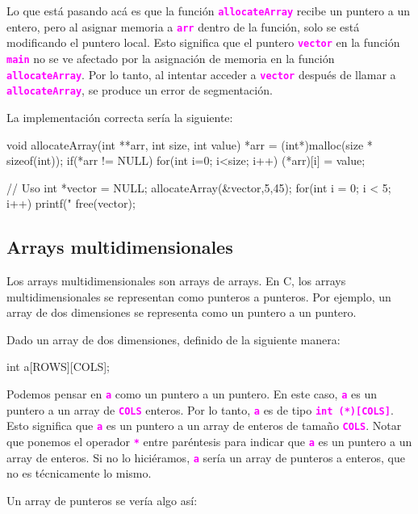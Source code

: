 \documentclass[]{scrartcl}
\newcommand{\hl}[1]{\textcolor{magenta}{\textbf{\texttt{#1}}}}
\begin{document}
Lo que está pasando acá es que la función \hl{allocateArray} recibe un puntero a un entero, pero al asignar memoria a \hl{arr} dentro de la función, solo se está modificando el puntero local. Esto significa que el puntero \hl{vector} en la función \hl{main} no se ve afectado por la asignación de memoria en la función \hl{allocateArray}. Por lo tanto, al intentar acceder a \hl{vector} después de llamar a \hl{allocateArray}, se produce un error de segmentación.

La implementación correcta sería la siguiente:

\begin{cbox}[]{}
  void allocateArray(int **arr, int size, int value) {
    *arr = (int*)malloc(size * sizeof(int));
    if(*arr != NULL) {
      for(int i=0; i<size; i++) {
        (*arr)[i] = value;
      }
    }
  }
  
  // Uso
  int *vector = NULL;
  allocateArray(&vector,5,45);
  for(int i = 0; i < 5; i++)
    printf("%
  free(vector);
\end{cbox}


\subsection*{Arrays multidimensionales}

Los arrays multidimensionales son arrays de arrays. En C, los arrays multidimensionales se representan como punteros a punteros. Por ejemplo, un array de dos dimensiones se representa como un puntero a un puntero. 

Dado un array de dos dimensiones, definido de la siguiente manera:

\begin{cbox}[]{}
  int a[ROWS][COLS];
\end{cbox}

Podemos pensar en \hl{a} como un puntero a un puntero. En este caso, \hl{a} es un puntero a un array de \hl{COLS} enteros. Por lo tanto, \hl{a} es de tipo \hl{int (*)[COLS]}. Esto significa que \hl{a} es un puntero a un array de enteros de tamaño \hl{COLS}. Notar que ponemos el operador \hl{*} entre paréntesis para indicar que \hl{a} es un puntero a un array de enteros. Si no lo hiciéramos, \hl{a} sería un array de punteros a enteros, que no es técnicamente lo mismo.

Un array de punteros se vería algo así:

\begin{center}
  \noindent {}
  \label{fig:array-of-pointers-meme}
\end{center}
\end{document}

